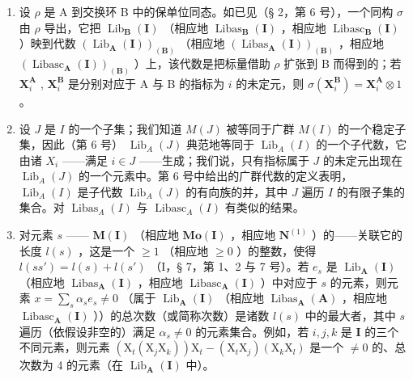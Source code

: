 \begin{enumerate}
\def\labelenumi{(\arabic{enumi})}
\setcounter{enumi}{1}
\item
  设 \(\rho\) 是 A 到交换环 B 中的保单位同态。如已见（§ 2，第 6 号），一个同构 \(\sigma\) 由 \(\rho\) 导出，它把 \(\operatorname{Lib}_{\mathbf{B}}(\mathbf{I})\) （相应地 \(\operatorname{Libas}_{\mathbf{B}}(\mathbf{I})\) ，相应地 \(\operatorname{Libasc}_{\mathbf{B}}(\mathbf{I})\) ）映到代数 \((\operatorname{Lib}_{\mathbf{A}}(\mathbf{I}))_{(\mathbf{B})}\) （相应地 \((\operatorname{Libas}_{\mathbf{A}}(\mathbf{I}))_{(\mathbf{B})}\) ，相应地 \((\operatorname{Libasc}_{\mathbf{A}}(\mathbf{I}))_{(\mathbf{B})}\) ）上，该代数是把标量借助 \(\rho\) 扩张到 B 而得到的；若 \(\mathbf{X}_i^{\mathbf{A}}\) , \(\mathbf{X}_i^{\mathbf{B}}\) 是分别对应于 A 与 B 的指标为 \(i\) 的未定元，则 \(\sigma(\mathbf{X}_i^{\mathbf{B}}) = \mathbf{X}_i^{\mathbf{A}} \otimes 1\) 。
\item
  设 \(J\) 是 \(I\) 的一个子集；我们知道 \(M(J)\) 被等同于广群 \(M(I)\) 的一个稳定子集，因此（第 6 号） \(\operatorname{Lib}_{A}(J)\) 典范地等同于 \(\operatorname{Lib}_{A}(I)\) 的一个子代数，它由诸 \(X_i\) ——满足 \(i \in J\) ——生成；我们说，只有指标属于 \(J\) 的未定元出现在 \(\operatorname{Lib}_{A}(J)\) 的一个元素中。第 6 号中给出的广群代数的定义表明， \(\operatorname{Lib}_{A}(I)\) 是子代数 \(\operatorname{Lib}_{A}(J)\) 的有向族的并，其中 \(J\) 遍历 \(I\) 的有限子集的集合。对 \(\operatorname{Libas}_{A}(I)\) 与 \(\operatorname{Libasc}_{A}(I)\) 有类似的结果。
\item
  对元素 \(s\) —— \(\mathbf{M}(\mathbf{I})\) （相应地 \(\mathbf{Mo}(\mathbf{I})\) ，相应地 \(\mathbf{N}^{(1)}\) ）的——关联它的长度 \(l(s)\) ，这是一个 \(\geqslant 1\) （相应地 \(\geqslant 0\) ）的整数，使得 \(l(ss') = l(s) + l(s')\) （I，§ 7，第 1、2 与 7 号）。若 \(e_s\) 是 \(\operatorname{Lib}_{\mathbf{A}}(\mathbf{I})\) （相应地 \(\operatorname{Libas}_{\mathbf{A}}(\mathbf{I})\) ，相应地 \(\operatorname{Libasc}_{\mathbf{A}}(\mathbf{I})\) ）中对应于 \(s\) 的元素，则元素 \(x = \sum_{s} \alpha_s e_s \neq 0\) （属于 \(\operatorname{Lib}_{\mathbf{A}}(\mathbf{I})\) （相应地 \(\operatorname{Libas}_{\mathbf{A}}(\mathbf{A})\) ，相应地 \(\operatorname{Libasc}_{\mathbf{A}}(\mathbf{I})\) ））的总次数（或简称次数）是诸数 \(l(s)\) 中的最大者，其中 \(s\) 遍历（依假设非空的）满足 \(\alpha_s \neq 0\) 的元素集合。例如，若 \(i, j, k\) 是 \(\mathbf{I}\) 的三个不同元素，则元素 \((\mathrm{X}_t(\mathrm{X}_j\mathrm{X}_k))\mathrm{X}_t - (\mathrm{X}_t\mathrm{X}_j)(\mathrm{X}_k\mathrm{X}_l)\) 是一个 \(\neq 0\) 的、总次数为 4 的元素（在 \(\operatorname{Lib}_{\mathbf{A}}(\mathbf{I})\) 中）。
\end{enumerate}

